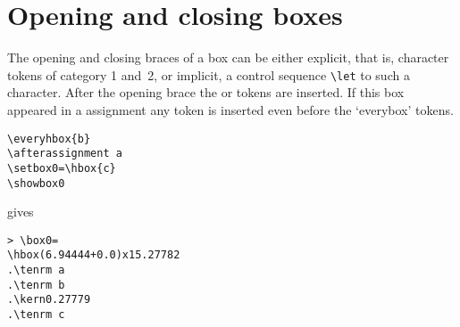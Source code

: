 \documentclass{book}
\begin{document}
\section{Opening and closing boxes}

The opening and closing braces of a box can be either explicit, that
is, character tokens of category 1
and~2, or implicit, a control sequence \verb=\let=
to such a character.  After the opening brace the  or
 tokens are inserted.  If this box appeared in a
 assignment any  token is
inserted even before the `everybox' tokens.

\begin{example} \label{every:box:assign}
\begin{verbatim}
\everyhbox{b}
\afterassignment a
\setbox0=\hbox{c}
\showbox0
\end{verbatim}
gives
\begin{verbatim}
> \box0=
\hbox(6.94444+0.0)x15.27782
.\tenrm a
.\tenrm b
.\kern0.27779
.\tenrm c
\end{verbatim}
\end{example}
\end{document}
